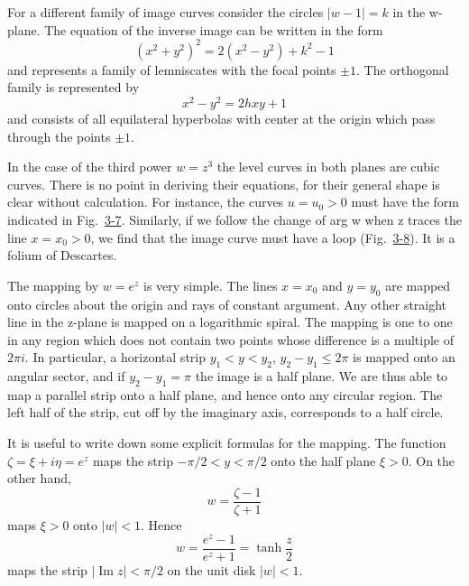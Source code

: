 For a different family of image curves consider the circles $|w - 1| = k$ in the w-plane. The equation of the inverse image can be written in the form
\begin{equation*}
(x ^ {2} + y ^ {2}) ^ {2} = 2 (x ^ {2} - y ^ {2}) + k ^ {2} - 1
\end{equation*}
and represents a family of lemniscates with the focal points $\pm1$. The orthogonal family is represented by
\begin{equation*}
x ^ {2} - y ^ {2} = 2 h x y + 1
\end{equation*}
and consists of all equilateral hyperbolas with center at the origin which pass through the points $\pm1$.

In the case of the third power $w = z^{3}$ the level curves in both planes are cubic curves. There is no point in deriving their equations, for their general shape is clear without calculation. For instance, the curves $u = u_{0} > 0$ must have the form indicated in Fig.~\hyperref[fig:3-7]{3-7}. Similarly, if we follow the change of arg w when z traces the line $x = x_{0} > 0$, we find that the image curve must have a loop (Fig.~\hyperref[fig:3-8]{3-8}). It is a folium of Descartes.


The mapping by $w = e^{z}$ is very simple. The lines $x = x_{0}$ and $y = y_{0}$ are mapped onto circles about the origin and rays of constant argument. Any other straight line in the z-plane is mapped on a logarithmic spiral. The mapping is one to one in any region which does not contain two points whose difference is a multiple of $2\pi i$. In particular, a horizontal strip $y_{1} < y < y_{2}$, $y_{2} - y_{1} \leq 2\pi$ is mapped onto an angular sector, and if $y_{2} - y_{1} = \pi$ the image is a half plane. We are thus able to map a parallel strip onto a half plane, and hence onto any circular region. The left half of the strip, cut off by the imaginary axis, corresponds to a half circle.

It is useful to write down some explicit formulas for the mapping. The function $\zeta = \xi + i\eta = e^{z}$ maps the strip $-\pi/2 < y < \pi/2$ onto the half plane $\xi > 0$. On the other hand,
\begin{equation*}
w = \frac {\zeta - 1}{\zeta + 1}
\end{equation*}
maps $\xi > 0$ onto $|w| < 1$. Hence
\begin{equation*}
w = \frac {e ^ {z} - 1}{e ^ {z} + 1} = \tanh \frac {z}{2}
\end{equation*}
maps the strip $|\operatorname{Im} z| < \pi/2$ on the unit disk $|w| < 1$.

